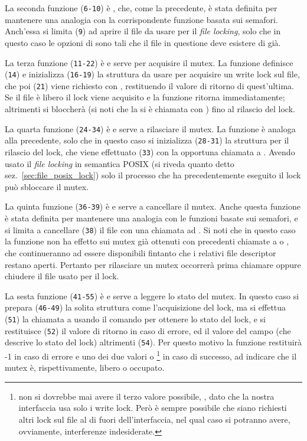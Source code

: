 La seconda funzione (\texttt{\small 6-10}) è , che, come la
precedente, è stata definita per mantenere una analogia con la corrispondente
funzione basata sui semafori. Anch'essa si limita (\texttt{\small 9}) ad
aprire il file da usare per il \textit{file locking}, solo che in questo caso
le opzioni di  sono tali che il file in questione deve esistere di
già.

La terza funzione (\texttt{\small 11-22}) è  e serve per
acquisire il mutex. La funzione definisce (\texttt{\small 14}) e inizializza
(\texttt{\small 16-19}) la struttura  da usare per acquisire un
write lock sul file, che poi (\texttt{\small 21}) viene richiesto con
, restituendo il valore di ritorno di quest'ultima. Se il file è
libero il lock viene acquisito e la funzione ritorna immediatamente;
altrimenti  si bloccherà (si noti che la si è chiamata con
) fino al rilascio del lock.

La quarta funzione (\texttt{\small 24-34}) è  e serve a
rilasciare il mutex. La funzione è analoga alla precedente, solo che in questo
caso si inizializza (\texttt{\small 28-31}) la struttura  per il
rilascio del lock, che viene effettuato (\texttt{\small 33}) con la opportuna
chiamata a . Avendo usato il \textit{file locking} in semantica
POSIX (si riveda quanto detto sez.~\ref{sec:file_posix_lock}) solo il processo
che ha precedentemente eseguito il lock può sbloccare il mutex.

La quinta funzione (\texttt{\small 36-39}) è  e serve a
cancellare il mutex. Anche questa funzione è stata definita per mantenere una
analogia con le funzioni basate sui semafori, e si limita a cancellare
(\texttt{\small 38}) il file con una chiamata ad . Si noti che in
questo caso la funzione non ha effetto sui mutex già ottenuti con precedenti
chiamate a  o , che continueranno ad essere
disponibili fintanto che i relativi file descriptor restano aperti. Pertanto
per rilasciare un mutex occorrerà prima chiamare  oppure
chiudere il file usato per il lock.

La sesta funzione (\texttt{\small 41-55}) è  e serve a
leggere lo stato del mutex. In questo caso si prepara (\texttt{\small 46-49})
la solita struttura  come l'acquisizione del lock, ma si effettua
(\texttt{\small 51}) la chiamata a  usando il comando
 per ottenere lo stato del lock, e si restituisce
(\texttt{\small 52}) il valore di ritorno in caso di errore, ed il valore del
campo  (che descrive lo stato del lock) altrimenti
(\texttt{\small 54}). Per questo motivo la funzione restituirà -1 in caso di
errore e uno dei due valori  o \footnote{non
  si dovrebbe mai avere il terzo valore possibile, , dato che
  la nostra interfaccia usa solo i write lock. Però è sempre possibile che
  siano richiesti altri lock sul file al di fuori dell'interfaccia, nel qual
  caso si potranno avere, ovviamente, interferenze indesiderate.} in caso di
successo, ad indicare che il mutex è, rispettivamente, libero o occupato.

